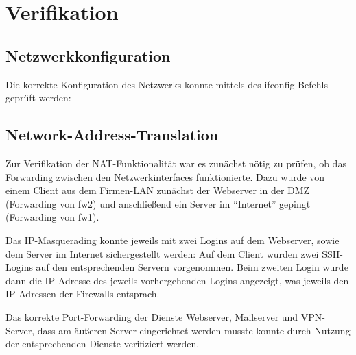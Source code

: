 \chapter{Verifikation}
\section{Netzwerkkonfiguration}
Die korrekte Konfiguration des Netzwerks konnte mittels des ifconfig-Befehls geprüft werden: %


\section{Network-Address-Translation}
Zur Verifikation der NAT-Funktionalität war es zunächst nötig zu prüfen, ob das Forwarding zwischen den Netzwerkinterfaces funktionierte. Dazu wurde von einem Client aus dem Firmen-LAN zunächst der Webserver in der DMZ (Forwarding von fw2) und anschließend ein Server im "`Internet"' gepingt (Forwarding von fw1). %


Das IP-Masquerading konnte jeweils mit zwei Logins auf dem Webserver, sowie dem Server im Internet sichergestellt werden: Auf dem Client wurden zwei SSH-Logins auf den entsprechenden Servern vorgenommen. Beim zweiten Login wurde dann die IP-Adresse des jeweils vorhergehenden Logins angezeigt, was jeweils den IP-Adressen der Firewalls entsprach.


Das korrekte Port-Forwarding der Dienste Webserver, Mailserver und VPN-Server, dass am äußeren Server eingerichtet werden musste konnte durch Nutzung der entsprechenden Dienste verifiziert werden.